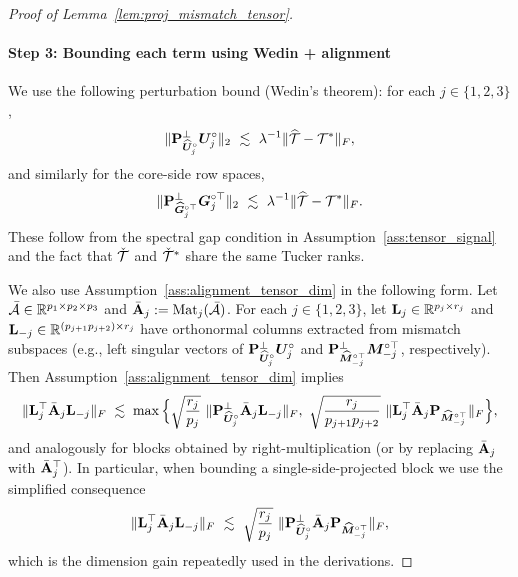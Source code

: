 \documentclass[authoryear,preprint,review,12pt]{elsarticle}
\begin{document}
{\begin{proof}[Proof of Lemma~\ref{lem:proj_mismatch_tensor}]
		\paragraph{Step 3: Bounding each term using Wedin + alignment}
		We use the following perturbation bound (Wedin's theorem): for each $j\in\{1,2,3\}$,
		\begin{equation}\label{eq:wedin_U}
			\|\mathbf{P}_{\widehat{\boldsymbol U}_j^\circ}^{\perp}\boldsymbol U_j^\circ\|_2
			\ \lesssim\
			\lambda^{-1}\|\widehat{\mathcal{T}}-\mathcal{T}^\ast\|_F,
		\end{equation}
		and similarly for the core-side row spaces,
		\begin{equation}\label{eq:wedin_G}
			\|\mathbf{P}_{\widehat{\boldsymbol G}_j^{\circ\top}}^{\perp}\boldsymbol G_j^{\circ\top}\|_2
			\ \lesssim\
			\lambda^{-1}\|\widehat{\mathcal{T}}-\mathcal{T}^\ast\|_F.
		\end{equation}
		These follow from the spectral gap condition in Assumption~\ref{ass:tensor_signal} and the fact that 
		$\check{\mathcal{T}}$ and $\check{\mathcal{T}}^\ast$ share the same Tucker ranks.
		
		We also use Assumption~\ref{ass:alignment_tensor_dim} in the following form.
		Let $\bar{\mathcal{A}}\in\mathbb{R}^{p_1\times p_2\times p_3}$ and $\bar{\mathbf{A}}_j:=\mathrm{Mat}_j(\bar{\mathcal{A}})$.
		For each $j\in\{1,2,3\}$, let $\mathbf{L}_j\in\mathbb{R}^{p_j\times r_j}$ and $\mathbf{L}_{-j}\in\mathbb{R}^{(p_{j+1}p_{j+2})\times r_j}$
		have orthonormal columns extracted from mismatch subspaces (e.g., left singular vectors of
		$\mathbf{P}_{\widehat{\boldsymbol U}_j^\circ}^{\perp}\boldsymbol U_j^\circ$ and $\mathbf{P}_{\widehat{\boldsymbol M}_{-j}^{\circ\top}}^{\perp}\boldsymbol M_{-j}^{\circ\top}$, respectively).
		Then Assumption~\ref{ass:alignment_tensor_dim} implies
		\begin{equation}\label{eq:alignment_use}
			\|\bL_j^{\top}\bar{\bA}_j\bL_{-j}\|_F
			\;\lesssim\;
			\max\Big\{
			\sqrt{\frac{r_j}{p_j}}\ \|\bP_{\widehat{\bU}_j^\circ}^{\perp}\bar{\bA}_j\bL_{-j}\|_F,\ 
			\sqrt{\frac{r_j}{p_{j+1}p_{j+2}}}\ \|\bL_j^{\top}\bar{\bA}_j\bP_{\widehat{\bM}_{-j}^{\circ\top}}\|_F
			\Big\},
		\end{equation}
		and analogously for blocks obtained by right-multiplication (or by replacing $\bar{\mathbf{A}}_j$ with $\bar{\mathbf{A}}_j^\top$).
		In particular, when bounding a single-side-projected block we use the simplified consequence
		\[
		\|\bL_j^{\top}\bar{\bA}_j\bL_{-j}\|_F
		\ \lesssim\
		\sqrt{\frac{r_j}{p_j}}\ \|\bP_{\widehat{\bU}_j^\circ}^{\perp}\bar{\bA}_j\bP_{\widehat{\bM}_{-j}^{\circ\top}}\|_F,
		\]
		which is the dimension gain repeatedly used in the derivations.
		

\end{proof}}
\end{document}
